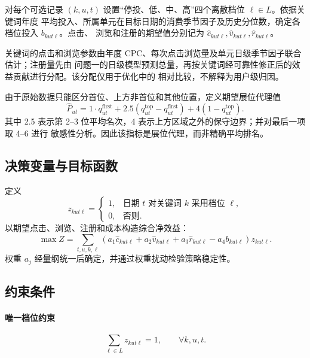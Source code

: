 \documentclass[UTF8,a4paper,zihao=-4]{ctexart}
\begin{document}
对每个可选记录 $(k,u,t)$ 设置“停投、低、中、高”四个离散档位 $\ell\in L$。依据关键词年度
平均投入、所属单元在目标日期的消费季节因子及历史分位数，确定各档位投入 $b_{kut\ell}$。点击、
浏览和注册的期望值分别记为 $\hat c_{kut\ell},\hat v_{kut\ell},\hat r_{kut\ell}$。

关键词的点击和浏览参数由年度 CPC、每次点击浏览量及单元日级季节因子联合估计；注册量先由
问题一的日级模型预测总量，再按关键词经可靠性修正后的效益贡献进行分配。该分配仅用于优化中的
相对比较，不解释为用户级归因。

由于原始数据只能区分首位、上方非首位和其他位置，定义期望展位代理值
\begin{equation}
  \hat P_{ut}=1\cdot q^{\mathrm{first}}_{ut}
  +2.5\left(q^{\mathrm{top}}_{ut}-q^{\mathrm{first}}_{ut}\right)
  +4\left(1-q^{\mathrm{top}}_{ut}\right).
\end{equation}
其中 2.5 表示第 2--3 位平均名次，4 表示上方区域之外的保守边界；并对最后一项取 4--6 进行
敏感性分析。因此该指标是展位代理，而非精确平均排名。

\subsection{决策变量与目标函数}

定义
\begin{equation}
  z_{kut\ell}=\begin{cases}
    1, & \text{日期 $t$ 对关键词 $k$ 采用档位 $\ell$},\\
    0, & \text{否则}.
  \end{cases}
\end{equation}
以期望点击、浏览、注册和成本构造综合净效益：
\begin{equation}
  \max Z=\sum_{t,u,k,\ell}
  \left(a_1\hat c_{kut\ell}+a_2\hat v_{kut\ell}
  +a_3\hat r_{kut\ell}-a_4b_{kut\ell}\right)z_{kut\ell}.
\end{equation}
权重 $a_j$ 经量纲统一后确定，并通过权重扰动检验策略稳定性。

\subsection{约束条件}

\paragraph{唯一档位约束}
\begin{equation}
  \sum_{\ell\in L}z_{kut\ell}=1,\qquad \forall k,u,t.
\end{equation}
\end{document}
